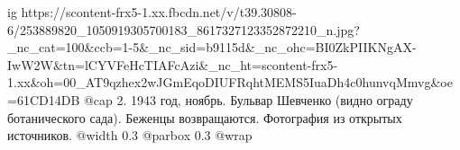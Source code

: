  
 
 
 
 

\ifcmt
  ig https://scontent-frx5-1.xx.fbcdn.net/v/t39.30808-6/253889820_1050919305700183_8617327123352872210_n.jpg?_nc_cat=100&ccb=1-5&_nc_sid=b9115d&_nc_ohc=BI0ZkPIIKNgAX-IwW2W&tn=lCYVFeHcTIAFcAzi&_nc_ht=scontent-frx5-1.xx&oh=00_AT9qzhex2wJGmEqoDIUFRqhtMEMS5IuaDh4c0hunvqMmvg&oe=61CD14DB
  @cap 2. 1943 год, ноябрь. Бульвар Шевченко (видно ограду ботанического сада). Беженцы возвращаются. Фотография из открытых источников. 
  @width 0.3
  @parbox 0.3
  @wrap \parpic[l]
\fi
